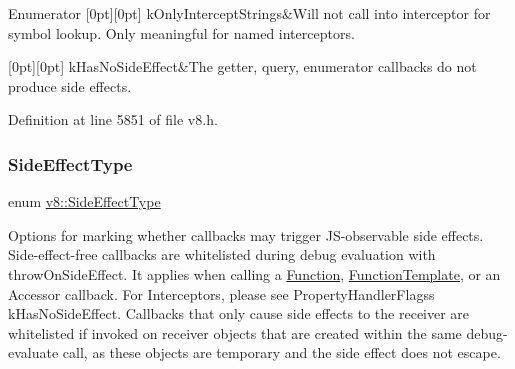 \begin{DoxyEnumFields}{Enumerator}
[0pt][0pt]{}\mbox{\label{namespacev8_af4789f0aeb8680e353901a35810cac1aa5258a8ba1695c486fea7d5b126c95509}} 
k\+Only\+Intercept\+Strings&Will not call into interceptor for symbol lookup. Only meaningful for named interceptors. \\
\hline

[0pt][0pt]{}\mbox{\label{namespacev8_af4789f0aeb8680e353901a35810cac1aa5168ab38be99edd5ce1e4cb991b21f51}} 
k\+Has\+No\+Side\+Effect&The getter, query, enumerator callbacks do not produce side effects. \\
\hline

\end{DoxyEnumFields}


Definition at line 5851 of file v8.\+h.

\mbox{\label{namespacev8_a29711319c2b9fc7716d65faee2f7b9cb}} 
\subsubsection{\texorpdfstring{Side\+Effect\+Type}{SideEffectType}}
{\footnotesize\ttfamily enum \mbox{\hyperlink{namespacev8_a29711319c2b9fc7716d65faee2f7b9cb}{v8\+::\+Side\+Effect\+Type}}\hspace{0.3cm}{\ttfamily [strong]}}

Options for marking whether callbacks may trigger J\+S-\/observable side effects. Side-\/effect-\/free callbacks are whitelisted during debug evaluation with throw\+On\+Side\+Effect. It applies when calling a \mbox{\hyperlink{classv8_1_1Function}{Function}}, \mbox{\hyperlink{classv8_1_1FunctionTemplate}{Function\+Template}}, or an Accessor callback. For Interceptors, please see Property\+Handler\+Flags\textquotesingle{}s k\+Has\+No\+Side\+Effect. Callbacks that only cause side effects to the receiver are whitelisted if invoked on receiver objects that are created within the same debug-\/evaluate call, as these objects are temporary and the side effect does not escape. 

